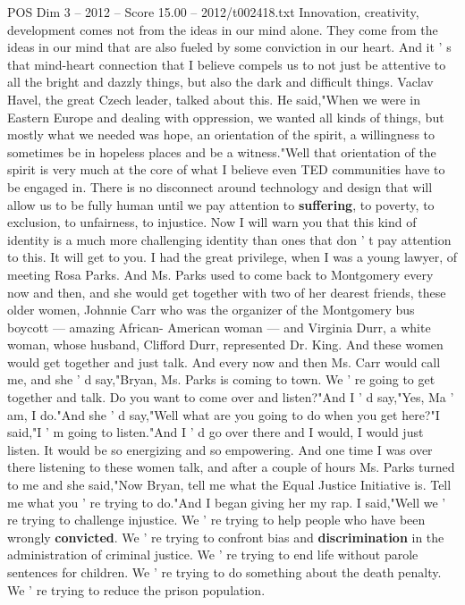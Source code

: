 \begin{textsample}{POS Dim 3 – 2012 – Score 15.00 – 2012/t002418.txt}
Innovation, creativity, development comes not from the ideas in our mind alone.
They come from the ideas in our mind that are also fueled by some conviction in our heart.
And it ' s that mind-heart connection that I believe compels us to not just be attentive to all the bright and dazzly things, but also the dark and difficult things.
Vaclav Havel, the great Czech leader, talked about this.
He said,"When we were in Eastern Europe and dealing with oppression, we wanted all kinds of things, but mostly what we needed was hope, an orientation of the spirit, a willingness to sometimes be in hopeless places and be a witness."Well that orientation of the spirit is very much at the core of what I believe even TED communities have to be engaged in.
There is no disconnect around technology and design that will allow us to be fully human until we pay attention to \textbf{suffering}, to poverty, to exclusion, to unfairness, to injustice.
Now I will warn you that this kind of identity is a much more challenging identity than ones that don ' t pay attention to this.
It will get to you.
I had the great privilege, when I was a young lawyer, of meeting Rosa Parks.
And Ms.
Parks used to come back to Montgomery every now and then, and she would get together with two of her dearest friends, these older women, Johnnie Carr who was the organizer of the Montgomery bus boycott — amazing African- American woman — and Virginia Durr, a white woman, whose husband, Clifford Durr, represented Dr.
King.
And these women would get together and just talk.
And every now and then Ms.
Carr would call me, and she ' d say,"Bryan, Ms.
Parks is coming to town.
We ' re going to get together and talk.
Do you want to come over and listen?"And I ' d say,"Yes, Ma ' am, I do."And she ' d say,"Well what are you going to do when you get here?"I said,"I ' m going to listen."And I ' d go over there and I would, I would just listen.
It would be so energizing and so empowering.
And one time I was over there listening to these women talk, and after a couple of hours Ms.
Parks turned to me and she said,"Now Bryan, tell me what the Equal Justice Initiative is.
Tell me what you ' re trying to do."And I began giving her my rap.
I said,"Well we ' re trying to challenge injustice.
We ' re trying to help people who have been wrongly \textbf{convicted}.
We ' re trying to confront bias and \textbf{discrimination} in the administration of criminal justice.
We ' re trying to end life without parole sentences for children.
We ' re trying to do something about the death penalty.
We ' re trying to reduce the prison population.

\end{textsample}
